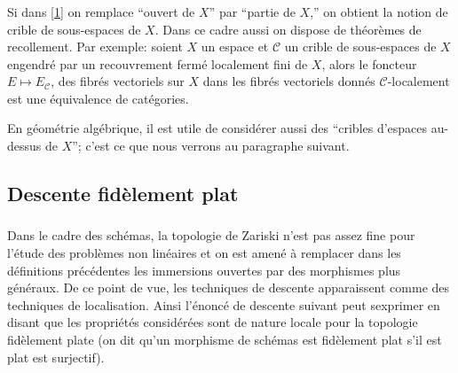 \documentclass{article}
\newcommand{\cC}{\mathcal{C}}
\begin{document}
\subsubsection{}\label{1-3-4}

Si dans \ref{1} on remplace ``ouvert de $X$'' par ``partie de 
$X$,'' on obtient la notion de crible de sous-espaces de $X$. Dans ce cadre 
aussi on dispose de théorèmes de recollement. Par exemple: soient $X$ un 
espace et $\cC$ un crible de sous-espaces de $X$ engendré par un recouvrement 
fermé localement fini de $X$, alors le foncteur $E\mapsto E_\cC$, des fibrés 
vectoriels sur $X$ dans les fibrés vectoriels donnés $\cC$-localement est une 
équivalence de catégories. 

En géométrie algébrique, il est utile de considérer aussi des ``cribles 
d'espaces au-dessus de $X$''; c'est ce que nous verrons au paragraphe suivant. 










\subsection{Descente fidèlement plat}\label{1-4}





\subsubsection{}\label{1-4-1}

Dans le cadre des schémas, la topologie de Zariski n'est pas assez fine pour 
l'étude des problèmes non linéaires et on est amené à remplacer dans les 
définitions précédentes les immersions ouvertes par des morphismes plus 
généraux. De ce point de vue, les techniques de descente apparaissent comme des 
techniques de localisation. Ainsi l'énoncé de descente suivant peut sexprimer 
en disant que les propriétés considérées sont de nature locale pour la 
topologie fidèlement plate (on dit qu'un morphisme de schémas est fidèlement 
plat s'il est plat est surjectif). 
\end{document}
